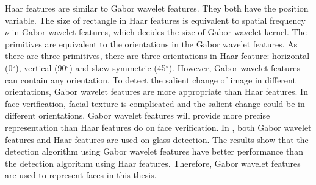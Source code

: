 Haar features are similar to Gabor wavelet features. They both have the position variable. The size of rectangle in Haar features is equivalent to spatial frequency $\nu$ in Gabor wavelet features, which decides the size of Gabor wavelet kernel. The primitives are equivalent to the orientations in the Gabor wavelet features. As there are three primitives, there are three orientations in Haar feature: horizontal (0$^\circ$), vertical (90$^\circ$) and skew-symmetric (45$^\circ$). However, Gabor wavelet features can contain any orientation. To detect the salient change of image in different orientations, Gabor wavelet features are more appropriate than Haar features. In face verification, facial texture is complicated and the salient change could be in different orientations. Gabor wavelet features will provide more precise representation than Haar features do on face verification. In \cite{Wu2004glasses}, both Gabor wavelet features and Haar features are used on glass detection. The results show that the detection algorithm using Gabor wavelet features have better performance than the detection algorithm using Haar features. Therefore, Gabor wavelet features are used to represent faces in this thesis.

